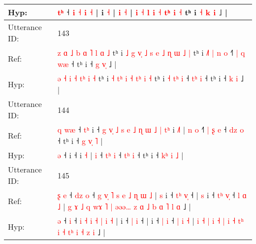 \documentclass[10pt]{article}
\DeclareRobustCommand{\hl}[1]{{\textcolor{red}{#1}}}
\begin{document}
\begin{longtable}{ll}
 \\
Hyp: & \hl{}\hl{}\hl{t}\hl{ʰ} ˧\hl{}\hl{}\hl{}\hl{}\hl{}\hl{}\hl{}\hl{}\hl{}\hl{}\hl{} \hl{i} \hl{˧} \hl{i} \hl{˧} |\hl{}\hl{}\hl{} i \hl{}\hl{˧} | \hl{}\hl{i} \hl{}\hl{˧} | \hl{i} \hl{˧} \hl{l} \hl{i} \hl{˧} \hl{}\hl{t}\hl{ʰ} \hl{i} \hl{˧} tʰ i \hl{˧} \hl{k} \hl{}\hl{i} ˩ |
 \\
\midrule
Utterance ID: & 143 \\
Ref: & \hl{z}\hl{ }\hl{ɑ} \hl{˩} \hl{b} \hl{ɑ} \hl{˥}\hl{ }\hl{l} \hl{ɑ} \hl{˩} tʰ i\hl{ }\hl{˩}\hl{ }\hl{g} \hl{v}\hl{̩} \hl{˩}\hl{ }\hl{s} \hl{e} \hl{˩} \hl{ɳ}\hl{ }\hl{ɯ} \hl{˩} \hl{|} tʰ i \hl{˩}\hl{˥} \hl{|}\hl{ }\hl{n} \hl{o} ˧\hl{˥} \hl{|}\hl{ }\hl{q} \hl{w}\hl{æ} ˧ tʰ i ˧ \hl{g} \hl{v}\hl{̩} ˩ |
 \\
Hyp: & \hl{}\hl{}\hl{ə} \hl{˧} \hl{i} \hl{˧} \hl{}\hl{t}\hl{ʰ} \hl{i} \hl{˧} tʰ i\hl{}\hl{}\hl{}\hl{} \hl{}\hl{˧} \hl{}\hl{t}\hl{ʰ} \hl{i} \hl{˧} \hl{}\hl{t}\hl{ʰ} \hl{i} \hl{˧} tʰ i \hl{}\hl{˧} \hl{}\hl{t}\hl{ʰ} \hl{i} ˧\hl{} \hl{}\hl{t}\hl{ʰ} \hl{}\hl{i} ˧ tʰ i ˧ \hl{k} \hl{}\hl{i} ˩ |
 \\
\midrule
Utterance ID: & 144 \\
Ref: & \hl{q}\hl{ }\hl{w}\hl{æ} ˧\hl{ }\hl{t}\hl{ʰ} i ˧\hl{ }\hl{g}\hl{ }\hl{v}\hl{̩}\hl{ }\hl{˩}\hl{ }\hl{s}\hl{ }\hl{e}\hl{ }\hl{˩}\hl{ }\hl{ɳ}\hl{ }\hl{ɯ}\hl{ }\hl{˩}\hl{ }\hl{|}\hl{ }\hl{t}\hl{ʰ} i \hl{˩}\hl{˥} |\hl{ }\hl{n} \hl{o} ˧\hl{˥} \hl{|}\hl{ }\hl{ʂ} \hl{e} ˧ \hl{d}\hl{z} \hl{o} ˧ tʰ i ˧ \hl{g}\hl{ }\hl{v}\hl{̩} \hl{˥} |
 \\
Hyp: & \hl{}\hl{}\hl{}\hl{ə} ˧\hl{}\hl{}\hl{} i ˧\hl{}\hl{}\hl{}\hl{}\hl{}\hl{}\hl{}\hl{}\hl{}\hl{}\hl{}\hl{}\hl{}\hl{}\hl{}\hl{}\hl{}\hl{}\hl{}\hl{}\hl{}\hl{}\hl{}\hl{} i \hl{}\hl{˧} |\hl{}\hl{} \hl{i} ˧\hl{} \hl{}\hl{t}\hl{ʰ} \hl{i} ˧ \hl{t}\hl{ʰ} \hl{i} ˧ tʰ i ˧ \hl{k}\hl{ʰ}\hl{ }\hl{i} \hl{˩} |
 \\
\midrule
Utterance ID: & 145 \\
Ref: & \hl{ʂ}\hl{ }\hl{e} ˧\hl{ }\hl{d}\hl{z} \hl{o} ˧\hl{ }\hl{g}\hl{ }\hl{v}\hl{̩} \hl{˥} \hl{s} \hl{e} \hl{˩} \hl{ɳ} \hl{ɯ} \hl{˩} |\hl{ }\hl{s} i ˧ \hl{t}\hl{ʰ} \hl{v}\hl{̩} ˧ |\hl{ }\hl{s} i ˧ \hl{t}\hl{ʰ} \hl{v}\hl{̩} ˧ \hl{l} \hl{ɑ} \hl{˩} | \hl{g} \hl{ɤ} \hl{˩} \hl{q} \hl{w}\hl{ɤ} \hl{˥} \hl{|} \hl{ə}\hl{ə}\hl{ə}\hl{…} \hl{z} \hl{ɑ} \hl{˩}\hl{ }\hl{b} \hl{ɑ} \hl{˥} \hl{l} \hl{ɑ} ˩ |
 \\
Hyp: & \hl{}\hl{}\hl{ə} ˧\hl{}\hl{}\hl{} \hl{i} ˧\hl{}\hl{}\hl{}\hl{}\hl{} \hl{i} \hl{˧} \hl{i} \hl{˧} \hl{|} \hl{i} \hl{˧} |\hl{}\hl{} i ˧ \hl{}\hl{|} \hl{}\hl{i} ˧ |\hl{}\hl{} i ˧ \hl{}\hl{|} \hl{}\hl{i} ˧ \hl{|} \hl{i} \hl{˧} | \hl{i} \hl{˧} \hl{|} \hl{i} \hl{}\hl{˧} \hl{|} \hl{i} \hl{˧}\hl{ }\hl{t}\hl{ʰ} \hl{i} \hl{˧} \hl{}\hl{t}\hl{ʰ} \hl{i} \hl{˧} \hl{z} \hl{i} ˩ |

\end{longtable}
\end{document}
